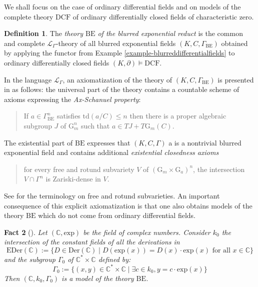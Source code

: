 \documentclass[12pt]{amsart}
\newcommand{\BE}{\mathrm{BE}}
\theoremstyle{definition}
\newtheorem{defn}{Definition}[section]
\theoremstyle{plain}
\newtheorem{fact}[defn]{Fact}
\theoremstyle{exampstyle}\newtheorem{thmx}{Theorem}
\theoremstyle{exampstyle}\newtheorem{thmxbis}{Theorem}
\newcommand{\Gm}{\mathrm{G}_m}
\newcommand{\Ga}{\mathrm{G}_a}
\begin{document}
We shall focus on the case of ordinary differential fields and on models of the complete theory $\mathrm{DCF}$ of ordinary differentially closed fields of characteristic zero. 



\begin{defn}\label{definition-BE}
The  {\em theory $\mathrm{BE}$ of the blurred exponential reduct} is the common and complete $\mathcal L_\Gamma$-theory of all blurred exponential fields  $(K,C,\Gamma_{\BE})$ obtained by applying the functor from Example \ref{example-blurreddifferentialfields} to ordinary differentially closed fields $(K,\partial) \models \mathrm{DCF}$.
\end{defn} 

In the language $\mathcal L_\Gamma$, an axiomatization of the theory of $(K,C,\Gamma_{\BE})$ is presented in \cite[Fact 2.3]{Kirby-blurred} as follows: the universal part of the theory  contains a countable scheme of axioms expressing the {\em Ax-Schanuel property}:

\begin{quote}
If $a \in \Gamma_{\BE}^n$ satisfies $\mathrm{td}(a/C) \leq n$ then there is a proper algebraic subgroup $J$ of $\Gm^n$ such that $a \in TJ + T\Gm(C)$.
\end{quote}
The existential part of $\BE$ expresses that $(K,C,\Gamma)$ a
is a nontrivial blurred exponential field and contains additional {\em existential closedness axioms}

\begin{quote} 
for every free and rotund subvariety $V$ of $(\Gm \times \Ga)^n$, the intersection $V \cap\Gamma^n$ is Zariski-dense in $V$.
\end{quote} 
See \cite{Kirby-blurred} for the terminology on free and rotund subvarieties. An important consequence of this explicit axiomatization is that one also obtains models of the theory $\BE$ which do not come from ordinary differential fields. 

\begin{fact}[{\cite[Theorem 1.4]{Kirby-blurred}}]\label{fact-standardmodel}
 Let $(\mathbb{C},\mathrm{exp})$ be the field of complex numbers. Consider $k_0$ the intersection of the constant fields of all the derivations in  
$$  \mathrm{EDer}(\mathbb{C}) := \lbrace D \in \mathrm{Der}(\mathbb{C}) \mid D(\mathrm{exp}(x)) = D(x) \cdot \mathrm{exp}(x) \text{ for all } x \in \mathbb{C} \rbrace $$
and the subgroup $\Gamma_0$ of $\mathbb{C}^\ast \times \mathbb{C}$ defined by:
$$\Gamma_0 := \lbrace (x,y) \in \mathbb{C}^\ast \times \mathbb{C} \mid \exists c \in k_0, y = c \cdot \mathrm{exp}(x) \rbrace $$
Then $(\mathbb{C},k_0,\Gamma_0)$ is a model of the theory $\BE$.
\end{fact}
\end{document}
